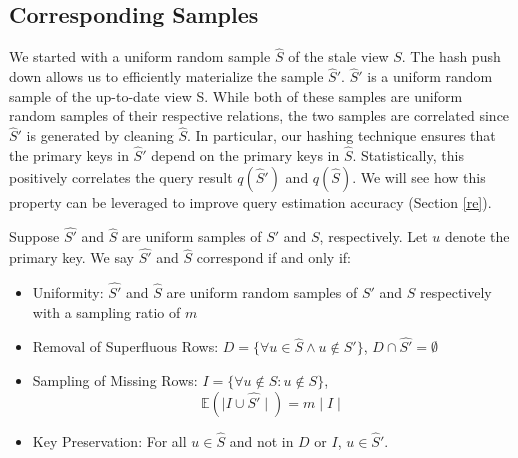 \subsection{Corresponding Samples}
We started with a uniform random sample $\widehat{S}$ of the stale view $S$.
The hash push down allows us to efficiently materialize the sample $\widehat{S}'$.
$\widehat{S}'$ is a uniform random sample of the up-to-date view S.
While both of these samples are uniform random samples of their respective relations, 
the two samples are correlated since $\widehat{S}'$ is generated by cleaning $\widehat{S}$.
In particular, our hashing technique ensures that the primary keys in $\widehat{S}'$ depend on the primary keys in $\widehat{S}$.
Statistically, this positively correlates the query result $q(\widehat{S}')$ and $q(\widehat{S})$. 
We will see how this property can be leveraged to improve query estimation accuracy (Section \ref{re}). 

\begin{property}[Correspondence]
Suppose $\widehat{S'}$ and $\widehat{S}$ are uniform samples of $S'$ and $S$, respectively.  Let $u$ denote the primary key. We say $\widehat{S'}$ and $\widehat{S}$ correspond if and only if:
\vspace{-.25em}
\begin{itemize}[noitemsep]
\item Uniformity: $\widehat{S'}$ and $\widehat{S}$ are uniform random samples of $S'$ and $S$ respectively with a sampling ratio of $m$
\item Removal of Superfluous Rows: $D = \{\forall u \in \widehat{S} \wedge u \not\in S'\}$, $D \cap \widehat{S'} = \emptyset$ 
\item Sampling of Missing Rows: $I = \{\forall u \not\in S : u \not \in S\}$, \[\mathbb{E}(\mid I \cup \widehat{S'} \mid) = m\mid I \mid \]
\item Key Preservation: For all $u\in \widehat{S}$ and not in $D$ or $I$, $u\in \widehat{S}'$.
\end{itemize}
\vspace{-.25em}
\label{correspondence}
\end{property}

